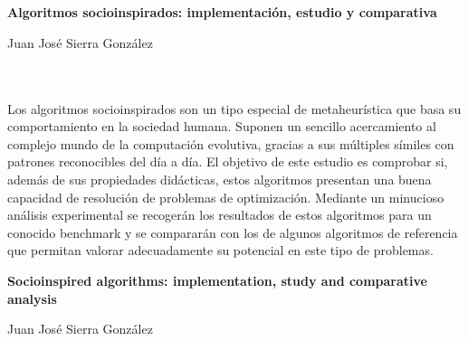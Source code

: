 \chapter*{}






\cleardoublepage
\thispagestyle{empty}

\begin{center}
{\large\bfseries Algoritmos socioinspirados: implementación, estudio y comparativa}\\
\end{center}
\begin{center}
Juan José Sierra González\\
\end{center}

\\

\vspace{0.7cm}
\\

Los algoritmos socioinspirados son un tipo especial de metaheurística que basa su comportamiento en la sociedad humana. Suponen un sencillo acercamiento al complejo mundo de la computación evolutiva, gracias a sus múltiples símiles con patrones reconocibles del día a día. El objetivo de este estudio es comprobar si, además de sus propiedades didácticas, estos algoritmos presentan una buena capacidad de resolución de problemas de optimización. Mediante un minucioso análisis experimental se recogerán los resultados de estos algoritmos para un conocido benchmark y se compararán con los de algunos algoritmos de referencia que permitan valorar adecuadamente su potencial en este tipo de problemas.
\cleardoublepage


\thispagestyle{empty}


\begin{center}
{\large\bfseries Socioinspired algorithms: implementation, study and comparative analysis}\\
\end{center}
\begin{center}
Juan José Sierra González\\
\end{center}

